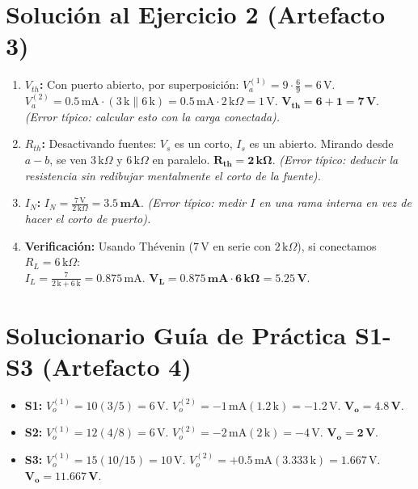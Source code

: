 \documentclass[11pt, a4paper]{article}
\begin{document}
\section*{Solución al Ejercicio 2 (Artefacto 3)}
\begin{enumerate}
    \item \textbf{$V_{th}$:} Con puerto abierto, por superposición: 
    $V_a^{(1)} = 9 \cdot \frac{6}{9} = 6\,\text{V}$. \quad $V_a^{(2)} = 0.5\,\text{mA} \cdot (3\,\text{k} \parallel 6\,\text{k}) = 0.5\,\text{mA} \cdot 2\,\text{k}\Omega = 1\,\text{V}$.
    $\mathbf{V_{th} = 6 + 1 = 7\,\text{V}}$. \textit{(Error típico: calcular esto con la carga conectada).}
    \item \textbf{$R_{th}$:} Desactivando fuentes: $V_s$ es un corto, $I_s$ es un abierto. Mirando desde $a-b$, se ven $3\,\text{k}\Omega$ y $6\,\text{k}\Omega$ en paralelo. $\mathbf{R_{th} = 2\,\text{k}\Omega}$. \textit{(Error típico: deducir la resistencia sin redibujar mentalmente el corto de la fuente).}
    \item \textbf{$I_N$:} $I_N = \frac{7\,\text{V}}{2\,\text{k}\Omega} = \mathbf{3.5\,\text{mA}}$. \textit{(Error típico: medir $I$ en una rama interna en vez de hacer el corto de puerto).}
    \item \textbf{Verificación:} Usando Thévenin ($7\,\text{V}$ en serie con $2\,\text{k}\Omega$), si conectamos $R_L = 6\,\text{k}\Omega$: \\
    $I_L = \frac{7}{2\,\text{k} + 6\,\text{k}} = 0.875\,\text{mA}$. $\mathbf{V_L = 0.875\,\text{mA} \cdot 6\,\text{k}\Omega = 5.25\,\text{V}}$.
\end{enumerate}

\section*{Solucionario Guía de Práctica S1-S3 (Artefacto 4)}
\begin{itemize}
    \item \textbf{S1:} $V_o^{(1)} = 10(3/5) = 6\,\text{V}$. $V_o^{(2)} = -1\,\text{mA}(1.2\,\text{k}) = -1.2\,\text{V}$. $\mathbf{V_o = 4.8\,\text{V}}$.
    \item \textbf{S2:} $V_o^{(1)} = 12(4/8) = 6\,\text{V}$. $V_o^{(2)} = -2\,\text{mA}(2\,\text{k}) = -4\,\text{V}$. $\mathbf{V_o = 2\,\text{V}}$.
    \item \textbf{S3:} $V_o^{(1)} = 15(10/15) = 10\,\text{V}$. $V_o^{(2)} = +0.5\,\text{mA}(3.333\,\text{k}) = 1.667\,\text{V}$. $\mathbf{V_o = 11.667\,\text{V}}$.
\end{itemize}
\end{document}
